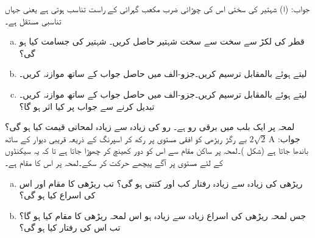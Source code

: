 جواب:\quad
(ا) 
\quad
شہتیر کی سختی  اس کی چوڑائی  ضرب مکعب گہرائی  کے راست تناسب ہوتی ہے یعنی  جہاں  تناسبی مستقل ہے۔ 
\begin{enumerate}[a.]
\item
{} قطر کی لکڑ سے سخت سے سخت شہتیر حاصل کریں۔ شہتیر کی جسامت کیا ہو گی؟
\item
{} لیتے ہوئے  بالمقابل  ترسیم کریں۔جزو-الف میں حاصل جواب کے ساتھ موازنہ کریں۔
\item
{} لیتے ہوئے  بالمقابل  ترسیم کریں۔جزو-الف میں حاصل جواب کے ساتھ موازنہ کریں۔  تبدیل کرنے سے جواب پر کیا اثر ہو گا؟
\end{enumerate}
لمحہ  پر ایک بلب میں برقی رو  ہے۔ رو کی زیادہ سے زیادہ لمحاتی قیمت کیا ہو گی؟\\
جواب:\quad
$2\sqrt{2}\,\si{\ampere}$
بے رگڑ ریڑھی کو افقی مستوی پر رکھ کر اسپرنگ کے ذریعہ قریبی دیوار کے ساتھ باندھا جاتا ہے (شکل )۔لمحہ  پر ساکن مقام سے اس کو  دور کھینچ کر چھوڑا جاتا ہے تا کہ یہ  سیکنڈوں کے لئے مستوی پر آگے پیچھے حرکت کر سکے۔لمحہ  پر اس کا مقام  ہے۔
\begin{enumerate}[a.]
\item
ریڑھی کی زیادہ سے زیادہ رفتار کب اور  کتنی ہو گی؟ تب ریڑھی کا مقام اور اس کی اسراع  کیا ہو گی؟
\item
جس لمحہ ریڑھی کی اسراع زیادہ سے زیادہ ہو اس لمحہ ریڑھی کا مقام کیا ہو گا؟ تب اس کی رفتار کیا ہو گی؟ 
\end{enumerate}
